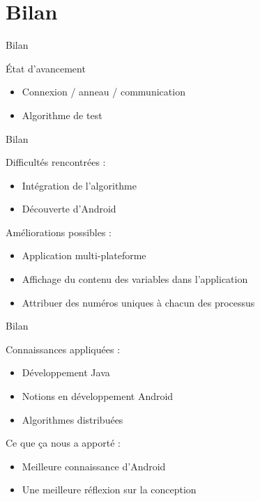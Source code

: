 \documentclass{beamer}
\begin{document}
    \section{Bilan}
    
    \begin{frame}{Bilan}
	  \begin{block}{État d'avancement}
	  \begin{itemize}
	   \item Connexion / anneau / communication
       \item Algorithme de test
	  \end{itemize}
	  \end{block}
    \end{frame}
    
    \begin{frame}{Bilan}

	  \begin{block}{Difficultés rencontrées :}
	  \begin{itemize}
	   \item Intégration de l'algorithme
       \item Découverte d'Android
	  \end{itemize}
	  \end{block}
	  \begin{block}{Améliorations possibles :}
	  \begin{itemize}
	   \item Application multi-plateforme
       \item Affichage du contenu des variables dans l'application
       \item Attribuer des numéros uniques à chacun des processus
	  \end{itemize}
	  \end{block}
    \end{frame}

    \begin{frame}{Bilan}
	  \begin{block}{Connaissances appliquées :}
	  \begin{itemize}
	   \item Développement Java
       \item Notions en développement Android
       \item Algorithmes distribuées
	  \end{itemize}
	  \end{block}
	  \begin{block}{Ce que ça nous a apporté :}
	  \begin{itemize}
	   \item Meilleure connaissance d’Android
       \item Une meilleure réflexion sur la conception
	  \end{itemize}
	  \end{block}
    \end{frame}
\end{document}
